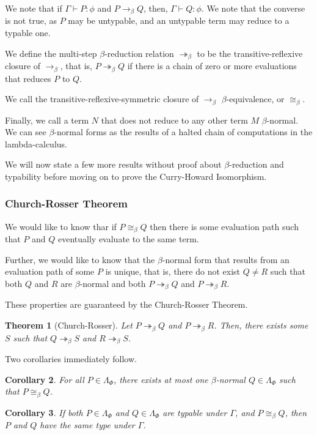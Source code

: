 \documentclass[12pt]{article}
\newtheorem{theorem}{Theorem}
\newtheorem{corollary}[theorem]{Corollary}
\begin{document}
We note that if $\Gamma\vdash P :\phi$ and $P \to_\beta Q$, then, $\Gamma\vdash Q:\phi$.
We note that the converse is not true, as $P$ may be untypable, 
and an untypable term may reduce to a typable one.  

We define the multi-step $\beta$-reduction relation $\twoheadrightarrow_\beta$
to be the transitive-reflexive closure of $\to_\beta$, that is, $P\twoheadrightarrow_\beta Q$ 
if there is a chain of zero or more evaluations that reduces $P$ to $Q$. 

We call the transitive-reflexive-symmetric closure of $\to_\beta$ $\beta$-equivalence, or $\cong_\beta$. 

Finally, we call a term $N$ that does not reduce to any other term $M$ $\beta$-normal. 
We can see $\beta$-normal forms as the results of a halted chain of computations
in the lambda-calculus. 

We will now state a few more results without proof about $\beta$-reduction 
and typability before moving on to prove the Curry-Howard Isomorphism. 
\subsubsection{Church-Rosser Theorem} 
We would like to know thar if $P\cong_\beta Q$ then there is some evaluation path
such that $P$ and $Q$ eventually evaluate to the same term. 

Further, we would like to know that the $\beta$-normal form that 
results from an evaluation path of some $P$ is unique, that is, 
there do not exist $Q\neq R$ such that both $Q$ and $R$ are $\beta$-normal
and both $P\twoheadrightarrow_\beta Q$ and $P\twoheadrightarrow_\beta R$. 

These properties are guaranteed by the Church-Rosser Theorem. 
\begin{theorem}[Church-Rosser]
Let $P\twoheadrightarrow_\beta Q$ and $P\twoheadrightarrow_\beta R$. 
Then, there exists some $S$ such that $Q\twoheadrightarrow_\beta S$ 
and $R\twoheadrightarrow_\beta S$. 
\end{theorem}
Two corollaries immediately follow. 
\begin{corollary}
For all $P \in \Lambda_\Phi$, there exists at most one $\beta$-normal
$Q\in \Lambda_\Phi$ such that $P \cong_\beta Q$. 
\end{corollary}
\begin{corollary}
If both $P\in\Lambda_\Phi$ and $Q\in\Lambda_\Phi$ are typable under $\Gamma$, 
and $P\cong_\beta Q$, then $P$ and $Q$ have the same type under $\Gamma$. 
\end{corollary}
\end{document}
